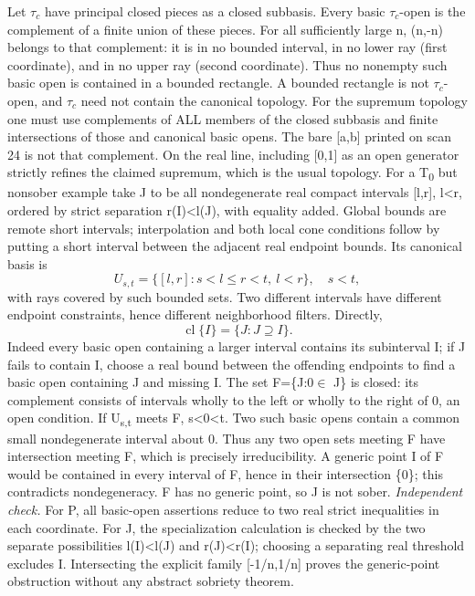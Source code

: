 Let $\tau_c$ have principal closed pieces as a closed subbasis. Every basic $\tau_c$-open is the complement of a finite union of these pieces. For all sufficiently large n, (n,-n) belongs to that complement: it is in no bounded interval, in no lower ray (first coordinate), and in no upper ray (second coordinate). Thus no nonempty such basic open is contained in a bounded rectangle. A bounded rectangle is not $\tau_c$-open, and $\tau_c$ need not contain the canonical topology. For the supremum topology one must use complements of ALL members of the closed subbasis and finite intersections of those and canonical basic opens. The bare [a,b] printed on scan 24 is not that complement. On the real line, including [0,1] as an open generator strictly refines the claimed supremum, which is the usual topology.
For a T\textsubscript{0} but nonsober example take J to be all nondegenerate real compact intervals [l,r], l<r, ordered by strict separation r(I)<l(J), with equality added. Global bounds are remote short intervals; interpolation and both local cone conditions follow by putting a short interval between the adjacent real endpoint bounds. Its canonical basis is
\[ U_{s,t}=\{[l,r]:s<l\leq r<t,\ l<r\},\quad s<t, \]
with rays covered by such bounded sets. Two different intervals have different endpoint constraints, hence different neighborhood filters. Directly,
\[\operatorname{cl}\{I\}=\{J:J\supseteq I\}.\]
Indeed every basic open containing a larger interval contains its subinterval I; if J fails to contain I, choose a real bound between the offending endpoints to find a basic open containing J and missing I. The set F=\{J:0$\in$ J\} is closed: its complement consists of intervals wholly to the left or wholly to the right of 0, an open condition. If U\textsubscript{s,t} meets F, s<0<t. Two such basic opens contain a common small nondegenerate interval about 0. Thus any two open sets meeting F have intersection meeting F, which is precisely irreducibility. A generic point I of F would be contained in every interval of F, hence in their intersection \{0\}; this contradicts nondegeneracy. F has no generic point, so J is not sober.
\emph{Independent check.} For P, all basic-open assertions reduce to two real strict inequalities in each coordinate. For J, the specialization calculation is checked by the two separate possibilities l(I)<l(J) and r(J)<r(I); choosing a separating real threshold excludes I. Intersecting the explicit family [-1/n,1/n] proves the generic-point obstruction without any abstract sobriety theorem.

